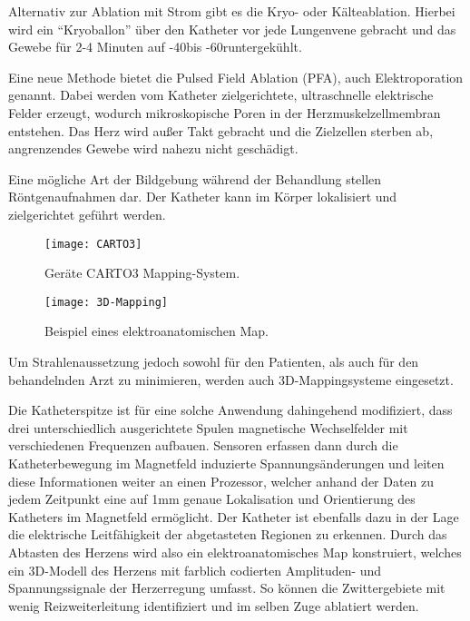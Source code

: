 \documentclass[11pt,a4paper,titlepage]{scrartcl}
\begin{document}
Alternativ zur Ablation mit Strom gibt es die Kryo- oder Kälteablation.
Hierbei wird ein \enquote{Kryoballon} \cite{Kälteablation} über den Katheter vor jede Lungenvene gebracht und das Gewebe für 2-4 Minuten auf -40\textcelsius bis -60\textcelsius runtergekühlt. \medskip

Eine neue Methode bietet die Pulsed Field Ablation (PFA), auch Elektroporation genannt.
Dabei werden vom Katheter zielgerichtete, ultraschnelle elektrische Felder erzeugt, wodurch mikroskopische Poren in der Herzmuskelzellmembran entstehen.
Das Herz wird außer Takt gebracht und die Zielzellen sterben ab, angrenzendes Gewebe wird nahezu nicht geschädigt. \medskip

Eine mögliche Art der Bildgebung während der Behandlung stellen Röntgenaufnahmen dar.
Der Katheter kann im Körper lokalisiert und zielgerichtet geführt werden.

    \begin{figure}
        \centering
        \caption{Geräte CARTO3 Mapping-System.}
        \label{carto}
        \texttt{[image: CARTO3]}
        \centering
        \end{figure}
    \begin{figure}
        \centering
        \caption{Beispiel eines elektroanatomischen Map.}
        \label{map}
        \texttt{[image: 3D-Mapping]}
        \centering
        \end{figure}

\newpage

Um Strahlenaussetzung jedoch sowohl für den Patienten, als auch für den behandelnden Arzt zu minimieren, werden auch 3D-Mappingsysteme eingesetzt. \medskip

Die Katheterspitze ist für eine solche Anwendung dahingehend modifiziert, dass drei unterschiedlich ausgerichtete Spulen magnetische Wechselfelder mit verschiedenen Frequenzen aufbauen.
Sensoren erfassen dann durch die Katheterbewegung im Magnetfeld induzierte Spannungsänderungen und leiten diese Informationen weiter an einen Prozessor, welcher anhand der Daten zu jedem Zeitpunkt eine auf 1mm genaue Lokalisation und Orientierung des Katheters im Magnetfeld ermöglicht.
Der Katheter ist ebenfalls dazu in der Lage die elektrische Leitfähigkeit der abgetasteten Regionen zu erkennen.
Durch das Abtasten des Herzens wird also ein elektroanatomisches Map konstruiert, welches ein 3D-Modell des Herzens mit farblich codierten Amplituden- und Spannungssignale der Herzerregung umfasst.
So können die Zwittergebiete mit wenig Reizweiterleitung identifiziert und im selben Zuge ablatiert werden. \medskip
\end{document}
